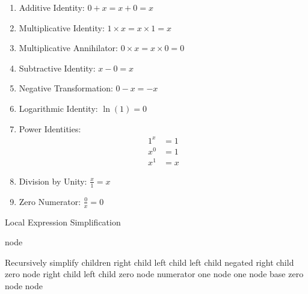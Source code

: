 \documentclass{report}
\begin{document}
\begin{enumerate}
    \item Additive Identity: $0 + x = x + 0 = x$
    \item Multiplicative Identity: $1 \times x = x \times 1= x$
    \item Multiplicative Annihilator: $0 \times x = x\times 0 = 0$
    \item Subtractive Identity: $x - 0 = x$
    \item Negative Transformation: $0 - x = -x$
    \item Logarithmic Identity: $\ln(1) = 0$
    \item Power Identities:
    \begin{align*}
        1^x &= 1 \\
        x^0 &= 1 \\
        x^1 &= x
    \end{align*}
    \item Division by Unity: $\frac{x}{1} = x$
    \item Zero Numerator: $\frac{0}{x} = 0$
\end{enumerate}

\begin{algorithm}[H]
\caption{Local Expression Simplification}
\begin{algorithmic}[1]
        \State \Return node 
    \EndIf
    
    \State Recursively simplify children
         \Return right child
         \Return left child
        \EndIf
         \Return left child
         \Return negated right child
        \EndIf
         \Return zero node
         \Return right child
         \Return left child
        \EndIf
         \Return zero node
         \Return numerator
        \EndIf
         \Return one node
         \Return one node
         \Return base
        \EndIf
         \Return zero node
        \EndIf
    \EndIf
    \State \Return node 
\EndFunction
\end{algorithmic}
\end{algorithm}
\end{document}
